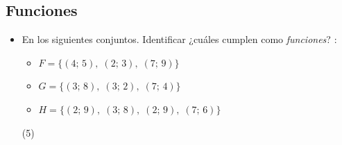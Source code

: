\documentclass[11pt, twocolumn, landscape, a4paper]{article}
\begin{document}
\subsection*{Funciones}

\begin{itemize}
\item{En los siguientes conjuntos. Identificar ¿cuáles cumplen como \emph{funciones}? :
\begin{itemize}
\item{$F = \Big\{ (4;\,5),\;(2;\,3),\;(7;\,9)\Big\}$}
\item{$G = \Big\{ (3;\,8),\;(3;\,2),\;(7;\,4)\Big\}$}
\item{$H = \Big\{ (2;\,9),\;(3;\,8),\;(2;\,9),\;(7;\,6)\Big\}$}
\end{itemize}

\begin{tasks}(5)
\end{tasks}

}
\end{itemize}
\end{document}
